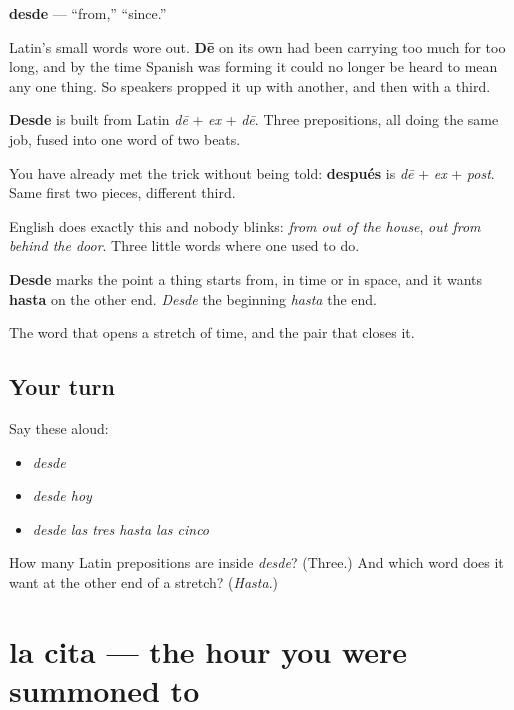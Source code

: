\begin{cousinweb}
\textbf{desde} — \textquotedblleft{}from,\textquotedblright{} \textquotedblleft{}since.\textquotedblright{}

Latin's small words wore out. \textbf{Dē} on its own had been carrying too much for too long, and by the time Spanish was forming it could no longer be heard to mean any one thing. So speakers propped it up with another, and then with a third.

\textbf{Desde} is built from Latin \emph{dē} + \emph{ex} + \emph{dē}. Three prepositions, all doing the same job, fused into one word of two beats.

You have already met the trick without being told: \textbf{después} is \emph{dē} + \emph{ex} + \emph{post}. Same first two pieces, different third.

English does exactly this and nobody blinks: \emph{from out of the house}, \emph{out from behind the door}. Three little words where one used to do.

\textbf{Desde} marks the point a thing starts from, in time or in space, and it wants \textbf{hasta} on the other end. \emph{Desde} the beginning \emph{hasta} the end.
\end{cousinweb}

\begin{grammarlens}[title={What you've built}]
The word that opens a stretch of time, and the pair that closes it.
\end{grammarlens}

\subsection*{Your turn}
Say these aloud:

\begin{itemize}
\raggedright
  \item \emph{desde}
  \item \emph{desde hoy}
  \item \emph{desde las tres hasta las cinco}
\end{itemize}

\begin{tcolorbox}[breakable,colback=teal!4,colframe=teal!35!black,title={Before you move on}]
How many Latin prepositions are inside \emph{desde}? (Three.) And which word does it want at the other end of a stretch? (\emph{Hasta}.)
\end{tcolorbox}
\section[la cita]{la cita — the hour you were summoned to}

